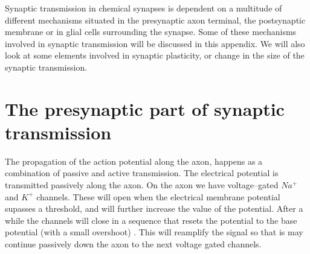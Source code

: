 Synaptic transmission in chemical synapses is dependent on a multitude of different mechanisms situated in the presynaptic axon terminal, the postsynaptic membrane or in glial cells surrounding the synapse.
Some of these mechanisms involved in synaptic transmission will be discussed in this appendix.
We will also look at some elements involved in synaptic plasticity, or change in the size of the synaptic transmission. %

\section{The presynaptic part of synaptic transmission}
\label{appendixSecPresynapticSynapticPartOfTransmission}
The propagation of the action potential along the axon, happens as a combination of passive and active transmission.
The electrical potential is transmitted passively along the axon. On the axon we have voltage--gated $Na^+$ and $K^+$ channels.
These will open when the electrical membrane potential supasses a threshold, and will further increase the value of the potential. 
After a while the channels will close in a sequence that resets the potential to the base potential (with a small overshoot) \cite{PrinciplesOfNeuralScience4edKAP09}. 
This will reamplify the signal  so that is may continue passively down the axon to the next voltage gated channels.

